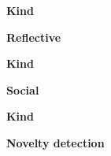 \documentclass{book}
\providecommand{\ProjectDeepHeading}[2]{%
    \par\medskip\noindent\textbf{#2}\par\smallskip
}
\begin{document}

\ProjectDeepHeading{4}{Kind}

\ProjectDeepHeading{5}{Reflective}


% 

\ProjectDeepHeading{6}{Kind}


% 


% 


% 


% 

\ProjectDeepHeading{5}{Social}


% 

\ProjectDeepHeading{6}{Kind}


% 


% 


% 

\ProjectDeepHeading{4}{Novelty detection}

\end{document}
